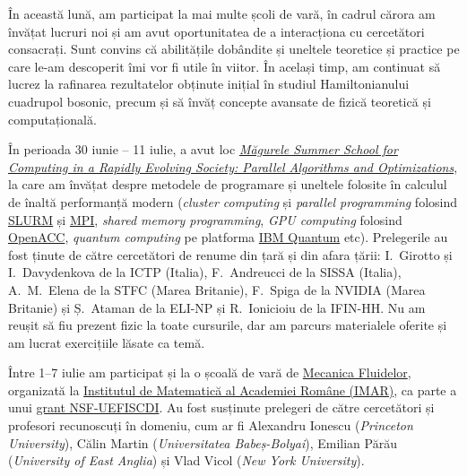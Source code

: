 
\makereportpreamble

\vspace{0.5em}

În această lună, am participat la mai multe școli de vară, în cadrul cărora am învățat lucruri noi și am avut oportunitatea de a interacționa cu cercetători consacrați. Sunt convins că abilitățile dobândite și uneltele teoretice și practice pe care le-am descoperit îmi vor fi utile în viitor. În același timp, am continuat să lucrez la rafinarea rezultatelor obținute inițial în studiul Hamiltonianului cuadrupol bosonic, precum și să învăț concepte avansate de fizică teoretică și computațională.

În perioada 30 iunie -- 11 iulie, a avut loc \href{https://indico.ictp.it/event/10842/}{\textit{Măgurele Summer School for Computing in a Rapidly Evolving Society: Parallel Algorithms and Optimizations}}, la care am învățat despre metodele de programare și uneltele folosite în calculul de înaltă performanță modern (\emph{cluster computing} și \emph{parallel programming} folosind \href{https://slurm.schedmd.com/overview.html}{SLURM} și \href{https://www.open-mpi.org/}{MPI}, \emph{shared memory programming}, \emph{GPU computing} folosind \href{https://www.openacc.org/}{OpenACC}, \emph{quantum computing} pe platforma \href{https://www.ibm.com/quantum}{IBM Quantum} etc). Prelegerile au fost ținute de către cercetători de renume din țară și din afara țării: I.~Girotto și I.~Davydenkova de la ICTP (Italia), F.~Andreucci de la SISSA (Italia), A.~M.~Elena de la STFC (Marea Britanie), F.~Spiga de la NVIDIA (Marea Britanie) și Ș.~Ataman de la ELI-NP și R.~Ionicioiu de la IFIN-HH. Nu am reușit să fiu prezent fizic la toate cursurile, dar am parcurs materialele oferite și am lucrat exercițiile lăsate ca temă.

Între 1--7 iulie am participat și la o școală de vară de \href{https://imar.ro/~imar/2025/Conferinte/NSF-UEFISCDI_SummerSchool.html}{Mecanica Fluidelor}, organizată la \href{https://imar.ro/ro}{Institutul de Matematică al Academiei Române (IMAR)}, ca parte a unui \href{https://web.math.princeton.edu/~aionescu/NSF-UEFISCDI.html}{grant NSF-UEFISCDI}. Au fost susținute prelegeri de către cercetători și profesori recunoscuți în domeniu, cum ar fi Alexandru Ionescu (\emph{Princeton University}), Călin Martin (\emph{Universitatea Babeș-Bolyai}), Emilian Părău (\emph{University of East Anglia}) și Vlad Vicol (\emph{New York University}).

